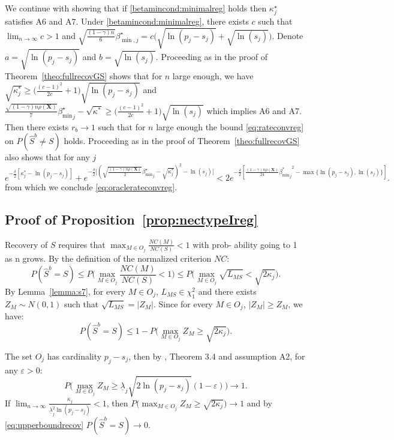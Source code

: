 \documentclass[aos]{imsart}
\theoremstyle{plain}
\newcommand{\bs}{\boldsymbol}
\begin{document}
We continue with showing that if \eqref{betamincond:minimalreg} holds then $\kappa^\star_j$ satisfies A6 and A7. Under \eqref{betamincond:minimalreg}, there exists $c$ such that $\lim_{n\to\infty} c>1$ and $\sqrt{\frac{(1-\gamma)n}{6}}\beta^\star_{\min,j}=c\big(\sqrt{\ln(p_j-s_j)} + \sqrt{\ln(s_j)}\big)$. Denote $a=\sqrt{\ln(p_j-s_j)}$ and $b=\sqrt{\ln(s_j)}$. Proceeding as in the proof of Theorem~\ref{theo:fullrecovGS} shows that for $n$ large enough, we have $\sqrt{\kappa^*_j} \geq  \big(\frac{(c-1)^2}{2c}+1\big)\sqrt{\ln(p_j-s_j)}$ and $\frac{\sqrt{(1-\gamma) n\rho(\bs X)}}{7}{{\beta_{\min}^{\star}}_j}-\sqrt{\kappa^*} \geq \big(\frac{(c-1)^2}{2c}+1\big)\sqrt{\ln(s_j)}$
    which implies A6 and A7.
Then there exists $r_b\to 1$ such that for $n$ large enough the bound \eqref{eq:rateconvreg} on $P(\hat S^b \neq S)$ holds. Proceeding as in the proof of Theorem~\ref{theo:fullrecovGS} also shows that for any $j$ 
    $$e^{-\frac{\delta}{2}\left[{\kappa^*_j}-\ln(p_j-s_j)\right]}+e^{-\frac{\delta}{2}\big[(\sqrt{\frac{(1-\gamma) n\rho(\bs X)}{2}}{{\beta_{\min}^{\star}}_j} - \sqrt{\kappa_j^*})^2 -\ln(s_j) \big]} <2 e^{-\frac{\delta}{2}[\frac{(1-\gamma) n\rho(\bs X)}{24}{{\beta_{\min}^*}_j}^2-\max\{\ln(p_j-s_j),\ln(s_j)\}]}. $$
from which we conclude \eqref{eq:oraclerateconvreg}.

\subsection{Proof of Proposition~\ref{prop:nectypeIreg}}

Recovery of $S$ requires that $\max_{M\in O_j}\frac{NC(M)}{NC(S)}<1$ with prob-
ability going to 1 as n grows. By the definition of the normalized criterion $NC$:
$$P(\hat{S}^b=S) \leq P\Big(\max_{M\in O_j}\frac{NC(M)}{NC(S)}<1\Big)\leq  P\big(\max_{M\in O_j}\sqrt{L_{MS}}<\sqrt{2\kappa_j}\Big).$$
By Lemma~\ref{lemma:s7}, for every $M\in O_j$, $L_{MS}\in \chi^2_1$ and there exists $Z_M\sim N(0,1)$ such that $\sqrt{L_{MS}}=|Z_M|$. Since for every $M\in O_j$, $|Z_M|\geq Z_M$, we have:
\begin{equation}\label{eq:upperboundrecov}
    P(\hat{S}^b=S) \leq  1-P\big(\max_{M\in O_j}Z_M\geq\sqrt{2\kappa_j}\Big).
\end{equation}

The set $O_j$ has cardinality $p_j-s_j$, then by \cite{hartigan}, Theorem 3.4  and assumption A2, for any $\varepsilon>0$:
$$P\big(\max_{M\in O_j}Z_M \geq \underline{\lambda}_j \sqrt{2 \ln(p_j-s_j)}(1-\varepsilon)\big) \to 1.$$
If $\lim_{n\to\infty}\frac{\kappa_j}{\underline{\lambda}_j^2\ln(p_j-s_j)} <1$, then $P\big(\max_{M\in O_j}Z_M\geq\sqrt{2\kappa_j}\big) \to 1$ and by \eqref{eq:upperboundrecov} $P(\hat{S}^b=S) \to 0$.
\end{document}
